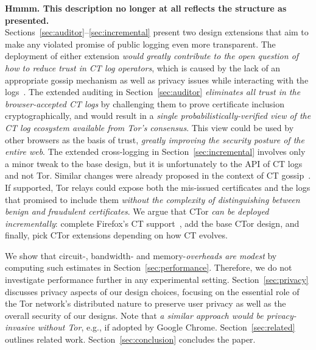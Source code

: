 {\bf \color{red} Hmmm. This description no longer at all reflects the
  structure as presented.}\\
Sections~\ref{sec:auditor}--\ref{sec:incremental} present two design extensions that
aim to make any violated promise of public logging even more transparent.  The
deployment of either extension
	\emph{would greatly contribute to the open question of how to reduce trust
	in CT log operators},
which is caused by the lack of an appropriate gossip mechanism as well as
privacy issues while interacting with the
logs~\cite{minimal-gossip,nordberg,ct-with-privacy}.
The extended auditing in Section~\ref{sec:auditor}
	\emph{eliminates all trust in the browser-accepted CT logs}
by challenging them to prove certificate inclusion cryptographically, and would
result in a
	\emph{single probabilistically-verified view of the CT log ecosystem
	available from Tor's consensus}.
This view could be used by other browsers as the basis of trust,
	\emph{greatly improving the security posture of the entire web}.
The extended cross-logging in Section~\ref{sec:incremental} involves only a minor tweak
to the base design, but it is unfortunately to the API of CT logs and not Tor.
Similar changes were already proposed in the context of CT
gossip~\cite{minimal-gossip}.  If supported, Tor relays could expose both the
mis-issued certificates and the logs that promised to include them \emph{without
the complexity of distinguishing between benign and fraudulent certificates}.
We argue that CTor \emph{can be deployed incrementally}:
	complete Firefox's CT support~\cite{ffct},
	add the base CTor design, and finally,
	pick CTor extensions depending on how CT evolves.

We show that circuit-, bandwidth- and memory-\emph{overheads are modest} by
computing such estimates in Section~\ref{sec:performance}.  Therefore, we
do not investigate performance further in any experimental setting.
Section~\ref{sec:privacy} discusses privacy aspects of our design choices,
focusing on the essential role of the Tor network's distributed nature
to preserve user privacy as well as the overall security of our designs.  Note
that \emph{a similar approach would be privacy-invasive without Tor}, e.g.,
if adopted by Google Chrome.
Section~\ref{sec:related} outlines related work.
Section~\ref{sec:conclusion} concludes the paper.
